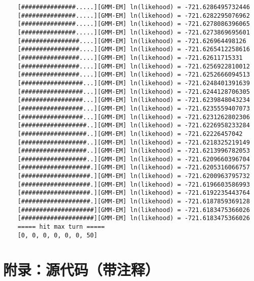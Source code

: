 \begin{verbatim}
    [###############.....][GMM-EM] ln(likehood) = -721.6286495732446
    [###############.....][GMM-EM] ln(likehood) = -721.6282295076962
    [###############.....][GMM-EM] ln(likehood) = -721.6278086396065
    [###############.....][GMM-EM] ln(likehood) = -721.6273869695601
    [################....][GMM-EM] ln(likehood) = -721.626964498126
    [################....][GMM-EM] ln(likehood) = -721.6265412258616
    [################....][GMM-EM] ln(likehood) = -721.62611715331
    [################....][GMM-EM] ln(likehood) = -721.6256922810012
    [################....][GMM-EM] ln(likehood) = -721.6252666094513
    [#################...][GMM-EM] ln(likehood) = -721.6248401391639
    [#################...][GMM-EM] ln(likehood) = -721.6244128706305
    [#################...][GMM-EM] ln(likehood) = -721.6239848043234
    [#################...][GMM-EM] ln(likehood) = -721.6235559407073
    [#################...][GMM-EM] ln(likehood) = -721.6231262802306
    [##################..][GMM-EM] ln(likehood) = -721.6226958233284
    [##################..][GMM-EM] ln(likehood) = -721.62226457042
    [##################..][GMM-EM] ln(likehood) = -721.6218325219149
    [##################..][GMM-EM] ln(likehood) = -721.6213996782053
    [##################..][GMM-EM] ln(likehood) = -721.6209660396704
    [###################.][GMM-EM] ln(likehood) = -721.6205316066757
    [###################.][GMM-EM] ln(likehood) = -721.6200963795732
    [###################.][GMM-EM] ln(likehood) = -721.6196603586993
    [###################.][GMM-EM] ln(likehood) = -721.6192235443764
    [###################.][GMM-EM] ln(likehood) = -721.6187859369128
    [####################][GMM-EM] ln(likehood) = -721.6183475366026
    [####################][GMM-EM] ln(likehood) = -721.6183475366026
    ===== hit max turn =====
    [0, 0, 0, 0, 0, 0, 50]
\end{verbatim}

\section{附录：源代码（带注释）}

